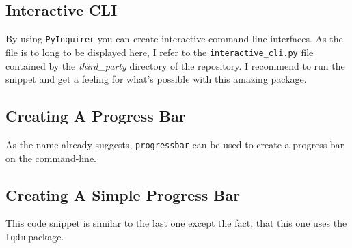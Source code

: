\subsection{Interactive CLI}

By using \lstinline{PyInquirer} you can create interactive command-line interfaces.
As the file is to long to be displayed here, I refer to the \lstinline{interactive_cli.py} file contained by the \textit{third\_party} directory of the repository.
I recommend to run the snippet and get a feeling for what's possible with this amazing package.


\subsection{Creating A Progress Bar}

As the name already suggests, \lstinline{progressbar} can be used to create a progress bar on the command-line.




\subsection{Creating A Simple Progress Bar}

This code snippet is similar to the last one except the fact, that this one uses the \lstinline{tqdm} package.


